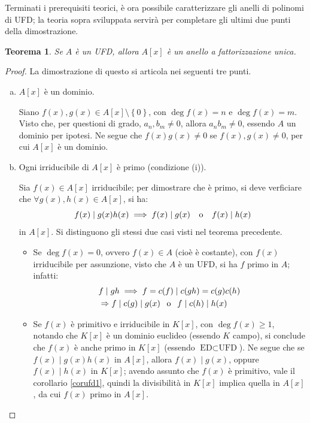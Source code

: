 \documentclass[11pt]{article}
\theoremstyle{style}
\newtheorem{teorema}{Teorema}[section]
\numberwithin{equation}{subsection}
\begin{document}
\noindent Terminati i prerequisiti teorici, \`e ora possibile caratterizzare gli anelli di polinomi di UFD; la teoria sopra sviluppata servir\`a per completare gli ultimi due punti della dimostrazione.
\begin{teorema}\label{th1an}
	Se $A$ \`e un UFD, allora $A[x]$ \`e un anello a fattorizzazione unica.
\end{teorema}
	\begin{proof}
		La dimostrazione di questo si articola nei seguenti tre punti.
		\begin{enumerate}[(a).]
			\item $A[x]$ \`e un dominio.

				Siano $f(x), g(x) \in A[x] \setminus\left\{ 0 \right\} $, con $\operatorname{deg} f(x) = n$ e $\operatorname{deg} f(x) = m$.
				Visto che, per questioni di grado, $a_n,b_m\neq 0$, allora $a_nb_m \neq 0$, essendo $A$ un dominio per ipotesi.
				Ne segue che $f(x) g(x) \neq 0$ se $f(x),g(x) \neq 0$, per cui $A[x]$ \`e un dominio.
			\item Ogni irriducibile di $A[x]$ \`e primo (condizione (i)).

				Sia $f(x) \in A[x]$ irriducibile; per dimostrare che \`e primo, si deve verficiare che $\forall g(x),h(x) \in A[x]$, si ha:
				\[
				f(x)  \mid g(x) h(x) \implies f(x)  \mid g(x) \hspace{.25cm} \text{ o } \hspace{.25cm} f(x)  \mid h(x)
				\] 
				in $A[x]$.
				Si distinguono gli stessi due casi visti nel teorema precedente.
				\begin{itemize}
					\item Se $\operatorname{deg} f(x) = 0 $, ovvero $f(x)  \in A$ (cio\`e \`e costante), con $f(x)$ irriducibile per assunzione, visto che $A$ \`e un UFD, si ha $f$ primo in $A$; infatti:
						\[
							\begin{split}
								&f \mid gh \implies f=c(f)  \mid c(gh) = c(g) c(h) \\
						&\Rightarrow f \mid c(g)  \mid g(x) \hspace{.15cm} \text{ o }\hspace{.15cm} f  \mid c(h)  \mid h(x)
							\end{split}
						\] 
					\item Se $f(x)$ \`e primitivo e irriducibile in $K[x]$, con $\operatorname{deg} f(x) \ge 1$, notando che $K[x]$ \`e un dominio euclideo (essendo $K$ campo), si conclude che $f(x)$ \`e anche primo in $K[x]$ (essendo $\text{ED}\subset \text{UFD}$).
						Ne segue che se $f(x)  \mid g(x) h(x)$ in $A[x]$, allora $f(x)  \mid g(x)$, oppure $f(x)  \mid h(x)$ in $K[x]$; avendo assunto che $f(x)$ \`e primitivo, vale il corollario \ref{corufd1}, quindi la divisibilit\`a in $K[x]$ implica quella in $A[x]$, da cui $f(x)$ primo in $A[x]$.
						

\end{itemize}
\end{enumerate}
\end{proof}
\end{document}
